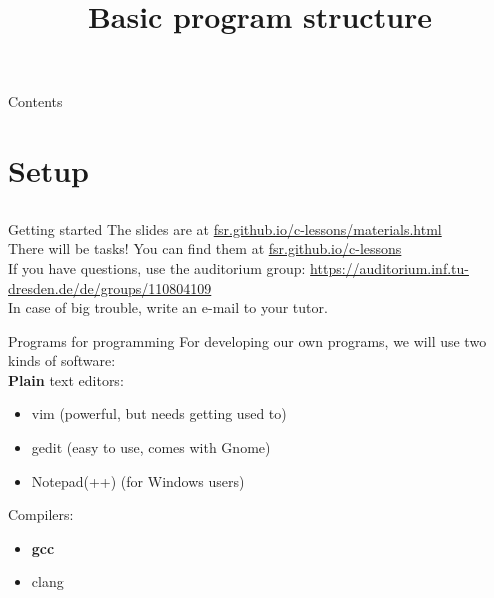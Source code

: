 
\usepackage{tikz}
\usepackage{hyperref}
\hypersetup{
	colorlinks=true,
	linkcolor=darkgray,
	urlcolor=blue,
}
\usepackage{graphicx}

\newcommand{\topic}{
    Basic program structure
}

\title{\topic}
\supertitle{\course}
\date{}



\maketitle

\begin{frame}{Contents}
	\tableofcontents
\end{frame}

\section{Setup}
\subsection{}

\begin{frame}{Getting started}
	The slides are at \href{https://fsr.github.io/c-lessons/materials.html}{fsr.github.io/c-lessons/materials.html}\\
	\bigskip
	There will be tasks! You can find them at \href{http://fsr.github.io/c-lessons/}{fsr.github.io/c-lessons}\\
	\bigskip
	If you have questions, use the auditorium group: \href{https://auditorium.inf.tu-dresden.de/de/groups/110804109}{https://auditorium.inf.tu-dresden.de/de/groups/110804109}\\
	\bigskip
	In case of big trouble, write an e-mail to your tutor.\\
\end{frame}

\begin{frame}{Programs for programming}
	For developing our own programs, we will use two kinds of software:\\
	\bigskip
	\textbf{Plain} text editors:
	\begin{itemize}
		\item vim (powerful, but needs getting used to)
		\item gedit (easy to use, comes with Gnome)
		\item Notepad(++) (for Windows users)
	\end{itemize}
	\bigskip
	Compilers:
	\begin{itemize}
		\item \textbf{gcc}
		\item clang
	\end{itemize}
\end{frame}

